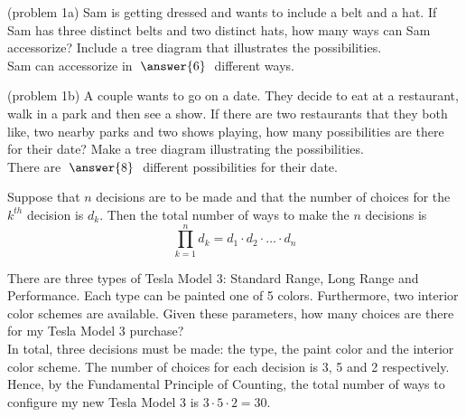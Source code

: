 \documentclass[handout]{ximera}
\begin{document}
\begin{problem}(problem 1a)
Sam is getting dressed and wants to include a belt and a hat.  
If Sam has three distinct belts and two distinct hats, how many ways
can Sam accessorize? Include a tree diagram that illustrates the possibilities.\\
Sam can accessorize in $\; \answer{6} \;$ different ways.
\end{problem}

\begin{problem}(problem 1b)
A couple wants to go on a date.  They decide to  eat at a restaurant, walk in a park and then see a show.
If there are two restaurants that they both like, two nearby parks and two shows playing, 
how many possibilities are there for their date? Make a tree diagram illustrating the possibilities.\\
There are $\;\answer{8}\;$ different possibilities for their date.
\end{problem}


\begin{theorem}
Suppose that $n$ decisions are to be made and that the number of choices for the $k^{th}$ decision is $d_k$.
Then the total number of ways to make the $n$ decisions is
\[
\prod_{k=1}^n d_k = d_1 \cdot d_2 \cdot \ldots \cdot d_n
\]
\end{theorem}

\begin{example}[example 2]
There are three types of Tesla Model 3: Standard Range, Long Range and Performance. 
Each type can be painted one of 5 colors. Furthermore, two interior color schemes are available. 
Given these parameters, how many choices are there for my Tesla Model 3 purchase?\\
In total, three decisions must be made: the type, the paint color and the interior color scheme.
The number of choices for each decision is 3, 5 and 2 respectively. 
Hence, by the Fundamental Principle of Counting, the total number of ways to configure my new 
Tesla Model 3 is $3 \cdot 5\cdot 2 = 30$.
\begin{image}
\end{image}
\end{example}
\end{document}
